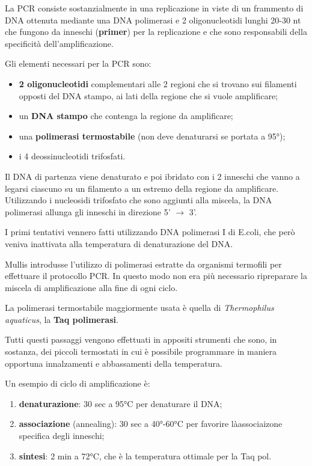 \documentclass[11pt]{book}
\begin{document}
La PCR consiste sostanzialmente in una replicazione in viste di un
frammento di DNA ottenuta mediante una DNA polimerasi e 2
oligonucleotidi lunghi 20-30 nt che fungono da inneschi
(\textbf{primer}) per la replicazione e che sono responsabili della
specificità dell'amplificazione.

Gli elementi necessari per la PCR sono:

\begin{itemize}
\itemsep1pt\parskip0pt
\item
  \textbf{2 oligonucleotidi} complementari alle 2 regioni che si trovano
  sui filamenti opposti del DNA stampo, ai lati della regione che si
  vuole amplificare;
\item
  un \textbf{DNA stampo} che contenga la regione da amplificare;
\item
  una \textbf{polimerasi termostabile} (non deve denaturarsi se portata
  a 95°);
\item
  i 4 deossinucleotidi trifosfati.
\end{itemize}

Il DNA di partenza viene denaturato e poi ibridato con i 2 inneschi che
vanno a legarsi ciascuno su un filamento a un estremo della regione da
amplificare. Utilizzando i nucleosidi trifosfato che sono aggiunti alla
miscela, la DNA polimerasi allunga gli inneschi in direzione 5'
\(\rightarrow\) 3'.

I primi tentativi vennero fatti utilizzando DNA polimerasi I di E.coli,
che però veniva inattivata alla temperatura di denaturazione del DNA.

Mullis introdusse l'utilizzo di polimerasi estratte da organismi
termofili per effettuare il protocollo PCR. In questo modo non era più
necessario ripreparare la miscela di amplificazione alla fine di ogni
ciclo.

La polimerasi termostabile maggiormente usata è quella di
\emph{Thermophilus aquaticus}, la \textbf{Taq polimerasi}.

Tutti questi passaggi vengono effettuati in appositi strumenti che sono,
in sostanza, dei piccoli termostati in cui è possibile programmare in
maniera opportuna innalzamenti e abbassamenti della temperatura.

Un esempio di ciclo di amplificazione è:

\begin{enumerate}
\def\labelenumi{\arabic{enumi}.}
\itemsep1pt\parskip0pt
\item
  \textbf{denaturazione}: 30 sec a 95°C per denaturare il DNA;
\item
  \textbf{associazione} (annealing): 30 sec a 40°-60°C per favorire
  làassociaizone specifica degli inneschi;
\item
  \textbf{sintesi}: 2 min a 72°C, che è la temperatura ottimale per la
  Taq pol.
\end{enumerate}
\end{document}
